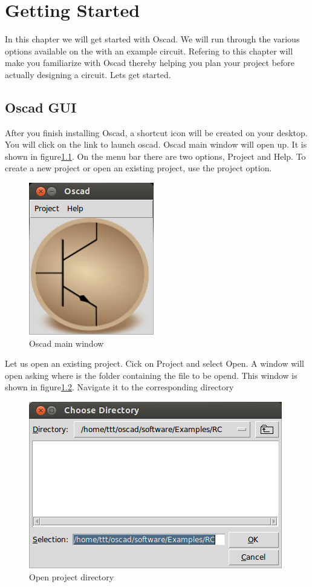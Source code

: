 
\chapter {Getting Started}

In this chapter we will get started with Oscad. We will run through the various options available on the  with an example circuit. Refering to this chapter will make you familiarize with Oscad thereby helping you plan your project before actually designing a circuit. Lets get started.

\section{Oscad GUI}
After you finish installing Oscad, a shortcut icon will be created on your desktop. You will click on the link to launch oscad. Oscad main window will open up. It is shown in figure\ref{main-window}. On the menu bar there are two options, Project and Help. To create a new project or open an existing project, use the project option.

\begin{figure}[h]
\begin{center}
\includegraphics[width=0.5\linewidth]{figures/main-window.png}
\caption{Oscad main window}
\label{main-window}
\end{center}
\end{figure}

Let us open an existing project. Cick on Project and select Open. A window will open asking where is the folder containing the file to be opend. This window is shown in figure\ref{open-directory}. Navigate it to the corresponding directory

\begin{figure}[h]
\begin{center}
\includegraphics[width=0.5\linewidth]{figures/open-project-directory.png}
\caption{Open project directory}
\label{open-directory}
\end{center}
\end{figure}




